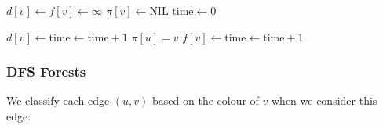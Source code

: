\begin{minipage}[t]{0.45\linewidth} \begin{algorithm}[H] \begin{algorithmic}[1]
        \State {}
            \State $d[v] \gets f[v] \gets \infty$
            \State $\pi[v] \gets \text{NIL}$
        \EndFor
        \State $\text{time} \gets 0$  
        \State {}
                \State {}
                \State {}
            \EndIf
        \EndFor
    \EndProcedure
\end{algorithmic} \end{algorithm} \end{minipage}
\hfill
\begin{minipage}[t]{0.45\linewidth} \begin{algorithm}[H] \begin{algorithmic}[1]
        \State {}
        \State $d[v] \gets \text{time} \gets \text{time} + 1$
        \State {}
        \State {}
                \State {}
                \State $\pi[u] = v$
                \State {}
            \EndIf
        \EndFor
        \State {}
        \State $f[v] \gets \text{time} \gets \text{time} + 1$
    \EndProcedure
\end{algorithmic} \end{algorithm} \end{minipage}

\subsubsection{DFS Forests}

We classify each edge $(u, v)$ based on the colour of $v$ when we consider this edge:

